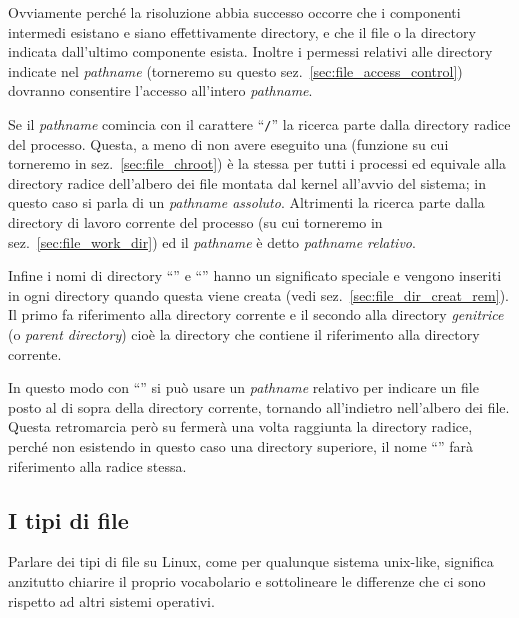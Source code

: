 Ovviamente perché la risoluzione abbia successo occorre che i componenti
intermedi esistano e siano effettivamente directory, e che il file o la
directory indicata dall'ultimo componente esista.  Inoltre i permessi relativi
alle directory indicate nel \textit{pathname} (torneremo su questo
sez.~\ref{sec:file_access_control}) dovranno consentire l'accesso all'intero
\textit{pathname}.


Se il \textit{pathname} comincia con il carattere ``\texttt{/}'' la ricerca
parte dalla directory radice del processo. Questa, a meno di non avere
eseguito una  (funzione su cui torneremo in
sez.~\ref{sec:file_chroot}) è la stessa per tutti i processi ed equivale alla
directory radice dell'albero dei file montata dal kernel all'avvio del
sistema; in questo caso si parla di un \textsl{pathname assoluto}. Altrimenti
la ricerca parte dalla directory di lavoro corrente del processo (su cui
torneremo in sez.~\ref{sec:file_work_dir}) ed il \textit{pathname} è detto
\textsl{pathname relativo}.


Infine i nomi di directory ``'' e ``'' hanno un significato
speciale e vengono inseriti in ogni directory quando questa viene creata (vedi
sez.~\ref{sec:file_dir_creat_rem}). Il primo fa riferimento alla directory
corrente e il secondo alla directory \textsl{genitrice} (o \textit{parent
  directory}) cioè la directory che contiene il riferimento alla directory
corrente.

In questo modo con ``'' si può usare un \textit{pathname} relativo
per indicare un file posto al di sopra della directory corrente, tornando
all'indietro nell'albero dei file.  Questa retromarcia però su fermerà una
volta raggiunta la directory radice, perché non esistendo in questo caso una
directory superiore, il nome ``''  farà riferimento alla radice
stessa.



\subsection{I tipi di file}
\label{sec:file_file_types}

Parlare dei tipi di file su Linux, come per qualunque sistema unix-like,
significa anzitutto chiarire il proprio vocabolario e sottolineare le
differenze che ci sono rispetto ad altri sistemi operativi.

